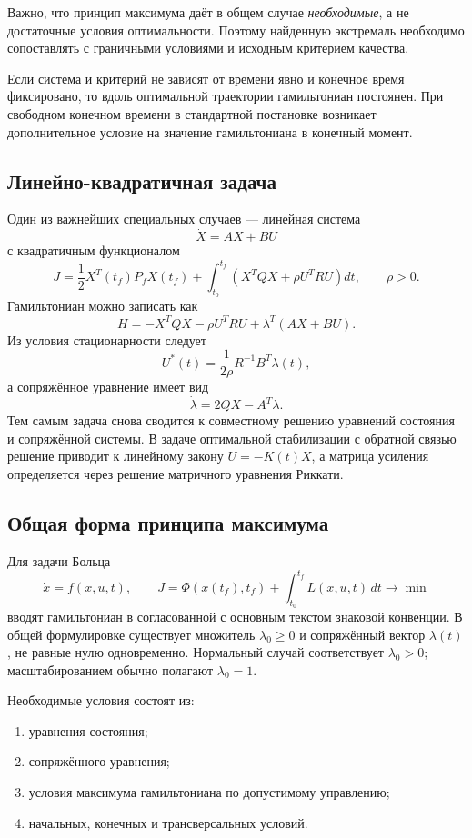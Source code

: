 Важно, что принцип максимума даёт в общем случае \emph{необходимые}, а не
достаточные условия оптимальности. Поэтому найденную экстремаль необходимо
сопоставлять с граничными условиями и исходным критерием качества.

Если система и критерий не зависят от времени явно и конечное время фиксировано,
то вдоль оптимальной траектории гамильтониан постоянен. При свободном конечном
времени в стандартной постановке возникает дополнительное условие на значение
гамильтониана в конечный момент.

\subsection{Линейно-квадратичная задача}

Один из важнейших специальных случаев --- линейная система
\[
    \dot X=AX+BU
\]
с квадратичным функционалом
\[
    J=\frac12 X^T(t_f)P_fX(t_f)+
    \int_{t_0}^{t_f}\left(X^TQX+\rho U^TRU\right)dt,
    \qquad \rho>0.
\]
Гамильтониан можно записать как
\[
    H=-X^TQX-\rho U^TRU+\lambda^T(AX+BU).
\]
Из условия стационарности следует
\[
    U^*(t)=\frac{1}{2\rho}R^{-1}B^T\lambda(t),
\]
а сопряжённое уравнение имеет вид
\[
    \dot\lambda=2QX-A^T\lambda.
\]
Тем самым задача снова сводится к совместному решению уравнений состояния и
сопряжённой системы. В задаче оптимальной стабилизации с обратной связью решение
приводит к линейному закону $U=-K(t)X$, а матрица усиления определяется через
решение матричного уравнения Риккати.


\subsection{Общая форма принципа максимума}

Для задачи Больца
\[
\dot x=f(x,u,t),\qquad
J=\Phi(x(t_f),t_f)+\int_{t_0}^{t_f}L(x,u,t)\,dt\to\min
\]
вводят гамильтониан в согласованной с основным текстом знаковой конвенции. В общей
формулировке существует множитель $\lambda_0\ge0$ и сопряжённый вектор
$\lambda(t)$, не равные нулю одновременно. Нормальный случай соответствует
$\lambda_0>0$; масштабированием обычно полагают $\lambda_0=1$.

Необходимые условия состоят из:
\begin{enumerate}
    \item уравнения состояния;
    \item сопряжённого уравнения;
    \item условия максимума гамильтониана по допустимому управлению;
    \item начальных, конечных и трансверсальных условий.
\end{enumerate}

